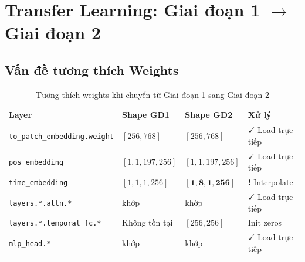 \documentclass[12pt,a4paper]{article}
\begin{document}
\begin{center}
\end{center}

\section{Transfer Learning: Giai đoạn 1 $\to$ Giai đoạn 2}

\subsection{Vấn đề tương thích Weights}

\begin{table}[h!]
\centering
\begin{tabular}{llll}
\toprule
\textbf{Layer} & \textbf{Shape GĐ1} & \textbf{Shape GĐ2} & \textbf{Xử lý} \\
\midrule
\texttt{to\_patch\_embedding.weight} & $[256, 768]$ & $[256, 768]$ & $\checkmark$ Load trực tiếp \\
\texttt{pos\_embedding}              & $[1,1,197,256]$ & $[1,1,197,256]$ & $\checkmark$ Load trực tiếp \\
\texttt{time\_embedding}             & $[1,1,1,256]$ & $\mathbf{[1,8,1,256]}$ & \textbf{!} Interpolate \\
\texttt{layers.*.attn.*}             & khớp & khớp & $\checkmark$ Load trực tiếp \\
\texttt{layers.*.temporal\_fc.*}     & Không tồn tại & $[256,256]$ & Init zeros \\
\texttt{mlp\_head.*}                 & khớp & khớp & $\checkmark$ Load trực tiếp \\
\bottomrule
\end{tabular}
\caption{Tương thích weights khi chuyển từ Giai đoạn 1 sang Giai đoạn 2}
\end{table}
\end{document}
